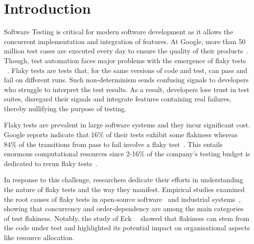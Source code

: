 \section{Introduction}
\label{sec:survey-introduction}

Software Testing is critical for modern software development as it allows the concurrent implementation and integration of features. %
At Google, more than 50 million test cases are executed every day to ensure the quality of their products~\cite{Welcomet41:online}.
Though, test automation faces major problems with the emergence of  flaky tests %
~\cite{FlakinessGoogle,Mozilla,FlakinessSpotify}. Flaky tests are tests that, for the same versions of code and test, can pass and fail on different runs.
Such non-determinism sends confusing signals to developers who struggle to interpret the test results. %
As a result, developers lose trust in test suites, disregard their signals and integrate features containing real failures, thereby nullifying the purpose of testing.

Flaky tests are prevalent in large software systems and they incur significant cost.
Google reports indicate that 16\% of their tests exhibit some flakiness whereas 84\% of the transitions from pass to fail involve a flaky test~\cite{FlakinessGoogle}.
This entails enormous computational resources since 2-16\% of the company's testing budget is dedicated to rerun flaky tests~\cite{GTAC2016}.

In response to this challenge, researchers dedicate their efforts in understanding the nature of flaky tests and the way they manifest.
Empirical studies examined the root causes of flaky tests in open-source software~\cite{luo_empirical_2014,eck_understanding_2019,Thorve2018,dutta_detecting_2020} and industrial systems~\cite{Lam2019RootCausing}, showing that concurrency and order-dependency are among the main categories of test flakiness. 
Notably, the study of Eck~\etal~\cite{eck_understanding_2019} showed that flakiness can stem from the code under test and highlighted its potential impact on organisational aspects like resource allocation.

